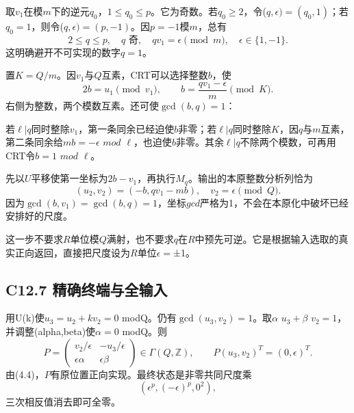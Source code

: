 \documentclass[11pt,a4paper]{article}
\theoremstyle{definition}
\numberwithin{equation}{section}
\begin{document}
{取\ensuremath{v_{1}}在模\ensuremath{m}下的逆元\ensuremath{q_{0}}，\ensuremath{1\le q_{0}\le p}。它为奇数。若\ensuremath{q_{0}\ge 2}，令(\ensuremath{q,\epsilon )=(q_{0},1)}；若\ensuremath{q_{0}=1}，则令(\ensuremath{q,\epsilon )=(p,-1)}。因\ensuremath{p=-1}模\ensuremath{m}，总有} \[
2\le q\le p,\quad q\text{ 奇},\quad
qv_1=\epsilon\pmod m,\quad\epsilon\in\{1,-1\}.
\tag{C12.6.1}
\] {这明确避开不可实现的数字\ensuremath{q=1}。}

{置\ensuremath{K=Q/m}。因\ensuremath{v_{1}}与\ensuremath{Q}互素，CRT可以选择整数\ensuremath{b}，使} \[
2b=u_1\pmod{v_1},\qquad
b=\frac{qv_1-\epsilon}{m}\pmod K.
\tag{C12.6.2}
\] {右侧为整数，两个模数互素。还可使\ensuremath{\operatorname{gcd}(b,q)=1}：}

{若\ensuremath{\ell |q}同时整除\ensuremath{v_{1}}，第一条同余已经迫使\ensuremath{b}非零；若\ensuremath{\ell |q}同时整除\ensuremath{K}，因\ensuremath{q}与\ensuremath{m}互素，第二条同余给\ensuremath{mb=-\epsilon }} {\ensuremath{mod}} {\ensuremath{\ell }，也迫使\ensuremath{b}非零。其余\ensuremath{\ell |q}不除两个模数，可再用CRT令\ensuremath{b=1}} {\ensuremath{mod}} {\ensuremath{\ell }。}

{先以\ensuremath{U}平移使第一坐标为\ensuremath{2b-v_{1}}，再执行\ensuremath{M_{q}}。输出的本原整数分析列恰为} \[
(u_2,v_2)=(-b,qv_1-mb),
\quad
\boxed{v_2=\epsilon\pmod Q.}
\tag{C12.6.3}
\] {因为\ensuremath{\operatorname{gcd}(b,v_{1})=\operatorname{gcd}(b,q)=1}，坐标\ensuremath{gcd}严格为1，不会在本原化中破坏已经安排好的尺度。}

{这一步不要求\ensuremath{R}单位模\ensuremath{Q}满射，也不要求\ensuremath{q}在\ensuremath{R}中预先可逆。它是根据输入选取的真实正向返回，直接把尺度设为\ensuremath{R}单位\ensuremath{\epsilon =}±1。}

\subsection*{\texorpdfstring{{C12.7} {精确终端与全输入}}{C12.7 精确终端与全输入}}\label{C12-h89}

{用U(k)使\ensuremath{u_{3}=u_{2}+kv_{2}=0}} {modQ。仍有\ensuremath{\operatorname{gcd}(u_{3},v_{2})=1}。取\ensuremath{\alpha }} {\ensuremath{u_{3}+\beta }} {\ensuremath{v_{2}=1}，并调整(alpha,beta)使\ensuremath{\alpha =0}} {modQ。则} \[
P=\begin{pmatrix}
v_2/\epsilon&-u_3/\epsilon\\
\epsilon\alpha&\epsilon\beta
\end{pmatrix}\in\Gamma(Q,\mathbb Z),
\qquad P(u_3,v_2)^T=(0,\epsilon)^T.
\] {由(4.4)，\ensuremath{P}有原位置正向实现。最终状态是非零共同尺度乘} \[
(\epsilon^p,(-\epsilon)^p,0^2),
\] {三次相反值消去即可全零。}
\end{document}
